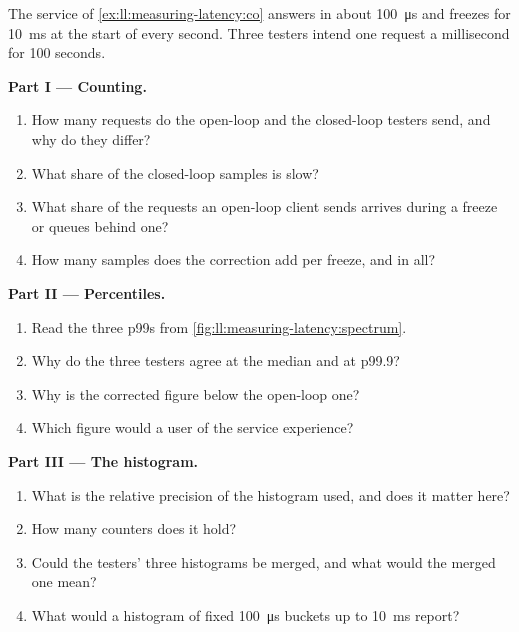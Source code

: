 \begin{problem}\label{pb:ll:measuring-latency:1}
The service of \cref{ex:ll:measuring-latency:co} answers in about \qty{100}{\micro\second} and freezes for
\qty{10}{\milli\second} at the start of every second. Three testers intend one request a millisecond for 100 seconds.

\medskip\noindent\textbf{Part I --- Counting.}
\begin{enumerate}
\item How many requests do the open-loop and the closed-loop testers send, and why do they differ?
\item What share of the closed-loop samples is slow?
\item What share of the requests an open-loop client sends arrives during a freeze or queues behind one?
\item How many samples does the correction add per freeze, and in all?
\end{enumerate}

\medskip\noindent\textbf{Part II --- Percentiles.}
\begin{enumerate}[resume]
\item Read the three p99s from \cref{fig:ll:measuring-latency:spectrum}.
\item Why do the three testers agree at the median and at p99.9?
\item Why is the corrected figure below the open-loop one?
\item Which figure would a user of the service experience?
\end{enumerate}

\medskip\noindent\textbf{Part III --- The histogram.}
\begin{enumerate}[resume]
\item What is the relative precision of the histogram used, and does it matter here?
\item How many counters does it hold?
\item Could the testers' three histograms be merged, and what would the merged one mean?
\item What would a histogram of fixed \qty{100}{\micro\second} buckets up to \qty{10}{\milli\second} report?
\end{enumerate}


\end{problem}
